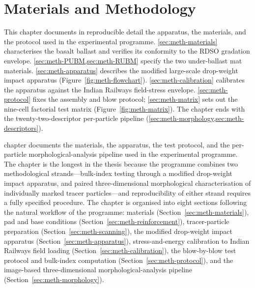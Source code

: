 \chapter[Methodology]{Materials and Methodology}
\label{chap:methodology}


\begin{chapterpreview}
This chapter documents in reproducible detail the apparatus, the
materials, and the protocol used in the experimental programme.
\cref{sec:meth-materials} characterises the basalt ballast and verifies
its conformity to the \gls{RDSO} gradation envelope.
\cref{sec:meth-PUBM,sec:meth-RUBM} specify the two under-ballast mat
materials. \cref{sec:meth-apparatus} describes the modified large-scale
drop-weight impact apparatus (Figure~\ref{fig:meth-flowchart}).
\cref{sec:meth-calibration} calibrates the apparatus against the
Indian Railways field-stress envelope. \cref{sec:meth-protocol} fixes
the assembly and blow protocol; \cref{sec:meth-matrix} sets out the
nine-cell factorial test matrix (Figure~\ref{fig:meth-matrix}). The
chapter ends with the twenty-two-descriptor per-particle pipeline
(\cref{sec:meth-morphology,sec:meth-descriptors}).
\end{chapterpreview}

 chapter documents the materials, the apparatus, the test protocol, and
the per-particle morphological-analysis pipeline used in the experimental
programme. The chapter is the longest in the thesis because the programme
combines two methodological strands---bulk-index testing through a modified
drop-weight impact apparatus, and paired three-dimensional morphological
characterisation of individually marked tracer particles---and
reproducibility of either strand requires a fully specified procedure. The
chapter is organised into eight sections following the natural workflow of
the programme: materials (Section~\ref{sec:meth-materials}), pad and base
conditions (Section~\ref{sec:meth-reinforcement}), tracer-particle
preparation (Section~\ref{sec:meth-scanning}), the modified drop-weight
impact apparatus (Section~\ref{sec:meth-apparatus}), stress-and-energy
calibration to Indian Railways field loading
(Section~\ref{sec:meth-calibration}), the blow-by-blow test protocol and
bulk-index computation (Section~\ref{sec:meth-protocol}), and the image-based
three-dimensional morphological-analysis pipeline
(Section~\ref{sec:meth-morphology}).

